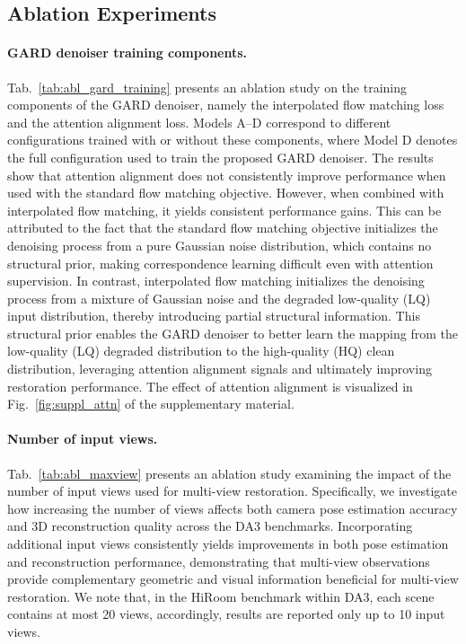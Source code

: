 \documentclass{llmxive}
\begin{document}
\subsection{Ablation Experiments}


\paragraph{GARD denoiser training components.}
Tab.~\ref{tab:abl_gard_training} presents an ablation study on the training components of the GARD denoiser, namely the interpolated flow matching loss and the attention alignment loss. Models A--D correspond to different configurations trained with or without these components, where Model D denotes the full configuration used to train the proposed GARD denoiser. The results show that attention alignment does not consistently improve performance when used with the standard flow matching objective. However, when combined with interpolated flow matching, it yields consistent performance gains. This can be attributed to the fact that the standard flow matching objective initializes the denoising process from a pure Gaussian noise distribution, which contains no structural prior, making correspondence learning difficult even with attention supervision. In contrast, interpolated flow matching initializes the denoising process from a mixture of Gaussian noise and the degraded low-quality (LQ) input distribution, thereby introducing partial structural information. This structural prior enables the GARD denoiser to better learn the mapping from the low-quality (LQ) degraded distribution to the high-quality (HQ) clean distribution, leveraging attention alignment signals and ultimately improving restoration performance. The effect of attention alignment is visualized in Fig.~\ref{fig:suppl_attn} of the supplementary material.


\paragraph{Number of input views.}
Tab.~\ref{tab:abl_maxview} presents an ablation study examining the impact of the number of input views used for multi-view restoration. Specifically, we investigate how increasing the number of views affects both camera pose estimation accuracy and 3D reconstruction quality across the DA3 benchmarks. Incorporating additional input views consistently yields improvements in both pose estimation and reconstruction performance, demonstrating that multi-view observations provide complementary geometric and visual information beneficial for multi-view restoration. We note that, in the HiRoom benchmark within DA3, each scene contains at most 20 views, accordingly, results are reported only up to 10 input views.
\end{document}

